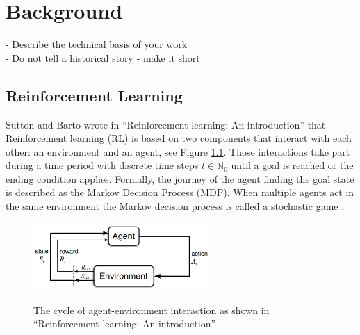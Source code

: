 \chapter{Background}\label{sec:Background}
- Describe the technical basis of your work \\
- Do not tell a historical story - make it short

\section{Reinforcement Learning}\label{reinforcement_learning}
Sutton and Barto wrote in ``Reinforcement learning: An introduction'' \cite{suba18} that Reinforcement learning (RL) is based on two components that interact with each other: an environment and an agent, see Figure \ref{fig:rl_cycle}. Those interactions take part during a time period with discrete time steps $t\in\mathbb{N}_0$ until a goal is reached or the ending condition applies. Formally, the journey of the agent finding the goal state is described as the Markov Decision Process (MDP).
When multiple agents act in the same environment the Markov decision process is called a stochastic game \cite{buba10}.
\begin{figure}[hpbt]
    \centering
    \includegraphics[width=0.6\textwidth]{pictures/RLInteractionSB}\\
    \caption[Reinforcement Learning Cycle]{The cycle of agent-environment interaction as
        shown in ``Reinforcement learning: An introduction'' \cite{suba18}}\label{fig:rl_cycle}
\end{figure}

